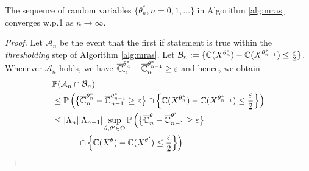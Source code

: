 
\begin{lemma}\label{lemma:iofo}
    The sequence of random variables $\{\theta^*_n,n=0,1,\ldots \}$ in Algorithm \ref{alg:mras} converges w.p.1 as $n\rightarrow \infty$.
\end{lemma}
\begin{proof}
    Let $\mathcal{A}_n$ be the event that the first if statement is true within the \textit{thresholding} step of Algorithm \ref{alg:mras}. Let $\mathcal{B}_n:=\{\mathbb{C}(X^{\theta^*_{n}})-\mathbb{C}(X^{\theta^*_{n-1}})\leq \frac{\varepsilon}{2}\}$.
    Whenever $\mathcal{A}_n$ holds, we have $\overline {\mathbb{C}}_n^{\theta^*_{n}}-\overline {\mathbb{C}}_n^{\theta^*_{n-1}}\geq \varepsilon$ and hence, we obtain
\begin{align*}
&\mathbb{P}(\mathcal{A}_{n}\cap \mathcal{B}_n) \\
&\leq \mathbb{P} 
\left(\big\{\overline \C_n^{\theta^*_{n}}-\overline \C_{n-1}^{\theta^*_{n-1}}\geq \varepsilon\big\}\cap \left\{\C(X^{\theta^*_{n}})-\C(X^{\theta^*_{n-1}})\leq \frac{\varepsilon}{2}\right\}\right)\\
&\leq  |\Lambda_n||\Lambda_{n-1}|\sup_{\theta,\theta'\in \Theta}\mathbb{P}\left(\big\{\overline \C_n^{\theta}-\overline \C_{n-1}^{\theta'}\geq \varepsilon\big\} \right.\\
&\quad\qquad \left.\cap \left\{\C(X^{\theta})-\C(X^{\theta'})\leq \frac{\varepsilon}{2}\right\} \right) \\

\end{align*}
\end{proof}
